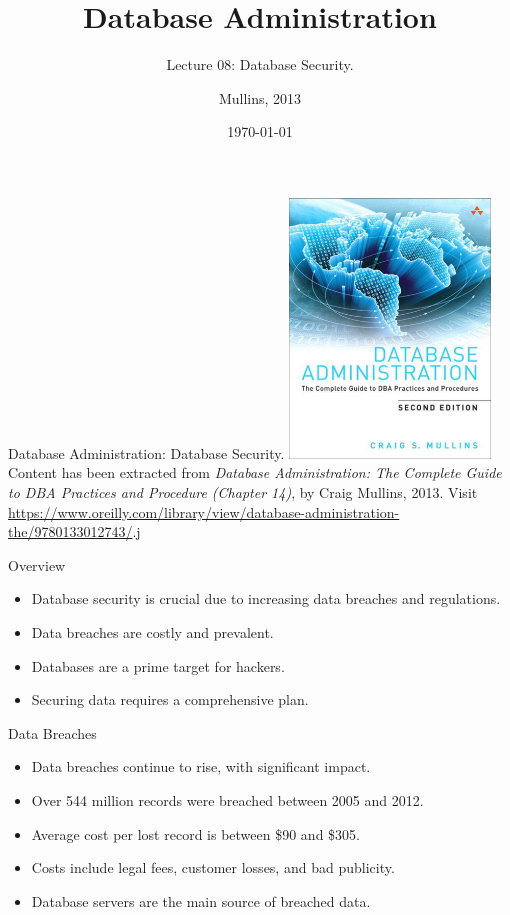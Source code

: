 \documentclass{beamer}
\title[DB Security]{Database Administration}
\subtitle{Lecture 08: Database Security.}
\author{Mullins, 2013}
\date{\today}
\begin{document}
\frame{\titlepage}

\begin{frame}{Database Administration: Database Security.}
    \centering
    \includegraphics[width=0.4\textwidth]{figures/book_cover}\\
    \vspace{2mm}
    {
        \scriptsize
        Content has been extracted from \textit{Database Administration: The Complete Guide to DBA Practices and Procedure (Chapter 14)}, by Craig Mullins, 2013.  Visit \url{https://www.oreilly.com/library/view/database-administration-the/9780133012743/}.j
    }
\end{frame}

\begin{frame}{Overview}
  \begin{itemize}
    \item Database security is crucial due to increasing data breaches and regulations.
    \item Data breaches are costly and prevalent.
    \item Databases are a prime target for hackers.
    \item Securing data requires a comprehensive plan.
  \end{itemize}
\end{frame}

\begin{frame}{Data Breaches}
  \begin{itemize}
    \item Data breaches continue to rise, with significant impact.
    \item Over 544 million records were breached between 2005 and 2012.
    \item Average cost per lost record is between \$90 and \$305.
    \item Costs include legal fees, customer losses, and bad publicity.
    \item Database servers are the main source of breached data.
  \end{itemize}
\end{frame}
\end{document}
